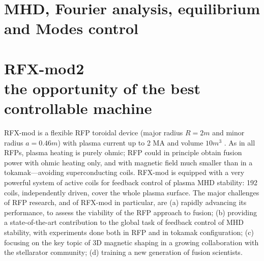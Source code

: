 

\section{MHD, Fourier analysis, equilibrium and Modes control}

\section{RFX-mod2 \\ \small{the opportunity of the best controllable machine}}
\cite{SONATO2003161}
\cite{doi:10.1063/1.4806765}
\cite{martin_RFX_overview}



RFX-mod is a flexible \ac{RFP} toroidal device (major radius $R=2 m$ and minor radius $a=0.46 m$) with plasma current up to 2 MA \cite{2MA_RFX_Current} and volume $10 m^3$ \cite{SONATO200597}. As in all RFPs, plasma heating is purely ohmic; \acl{RFP} could in principle obtain fusion power with ohmic heating only, and with magnetic field much smaller than in a tokamak—avoiding superconducting coils. RFX-mod is equipped with a very powerful system of active coils for feedback control of plasma MHD stability: 192 coils, independently driven, cover the whole plasma surface.
The major challenges of RFP research, and of RFX-mod in particular, are (a) rapidly advancing its performance, to assess the viability of the RFP approach to fusion; (b) providing a state-of-the-art contribution to the global task of feedback control of MHD stability, with experiments done both in RFP and in tokamak configuration; (c) focusing on the key topic of 3D magnetic shaping in a growing collaboration with the stellarator community; (d) training a new generation of fusion scientists.




